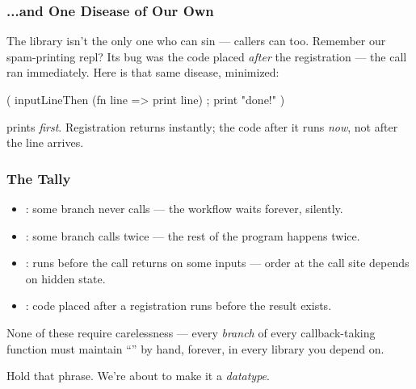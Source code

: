 \documentclass[aspectratio=169]{beamer}
\begin{document}
\begin{frame}[fragile]
  \frametitle{...and One Disease of Our Own}

  The library isn't the only one who can sin --- callers can too.
  Remember our spam-printing repl? Its bug was the code placed
  \textit{after} the registration --- the  call ran
  immediately. Here is that same disease, minimized:

  \begin{codeblock}
    ( inputLineThen (fn line => print line)
    ; print "done!" )
\end{codeblock}

  \pause
  \vspace{\fill}

   prints \textit{first}. Registration returns instantly;
  the code after it runs \textit{now}, not after the line arrives.

  \pause
  \vspace{\fill}

\end{frame}

\begin{frame}[fragile]
  \frametitle{The Tally}

  \begin{itemize}
    \item {}: some branch never calls  --- the
      workflow waits forever, silently.
    \item {}: some branch calls  twice --- the rest
      of the program happens twice.
    \item {}:  runs before the call returns
      on some inputs --- order at the call site depends on hidden
      state.
    \item {}: code placed after a registration runs
      before the result exists.
  \end{itemize}

  \pause
  \vspace{\fill}

  None of these require carelessness --- every \textit{branch} of every
  callback-taking function must maintain ``'' by hand, forever, in every library you depend on.

  \pause
  \vspace{\fill}

  Hold that phrase. We're about to make it a \textit{datatype}.
\end{frame}
\end{document}
